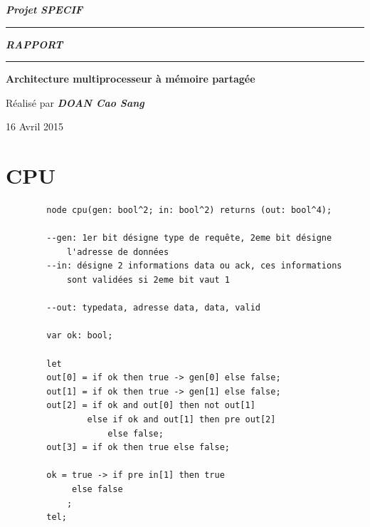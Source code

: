 \documentclass[a4paper,11pt]{report}
\begin{document}
	\begin{titlepage}
		\begin{center}
			\large\bfseries\itshape Projet SPECIF\\
		\end{center}
		\noindent\rule{\linewidth}{3pt}

		\begin{center}
			\Huge\bfseries\itshape RAPPORT\\
		\end{center}
		
		\noindent\rule{\linewidth}{3pt}
		\begin{center}
			\bfseries
			\large Architecture multiprocesseur à mémoire partagée
			
		\end{center}
		\begin{center}
			Réalisé par \bfseries \itshape DOAN Cao Sang
		\end{center}
		\begin{center}
			16 Avril 2015
		\end{center}
	\end{titlepage}


\chapter{CPU}
	\begin{framed}
		\begin{verbatim}
		node cpu(gen: bool^2; in: bool^2) returns (out: bool^4);

		--gen: 1er bit désigne type de requête, 2eme bit désigne 
			l'adresse de données
		--in: désigne 2 informations data ou ack, ces informations 
			sont validées si 2eme bit vaut 1

		--out: typedata, adresse data, data, valid

		var ok: bool;

		let
		out[0] = if ok then true -> gen[0] else false;
		out[1] = if ok then true -> gen[1] else false;
		out[2] = if ok and out[0] then not out[1]
                else if ok and out[1] then pre out[2]
                    else false;
		out[3] = if ok then true else false;

		ok = true -> if pre in[1] then true
             else false
			;
		tel;
	\end{verbatim}
	\end{framed}
	
\end{document}
